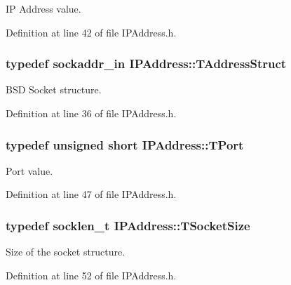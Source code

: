 I\-P Address value. 



Definition at line 42 of file I\-P\-Address.\-h.

\hypertarget{class_i_p_address_a45062a631f57459b18c10c1c8fe310bf}{
\subsubsection[{T\-Address\-Struct}]{\setlength{\rightskip}{0pt plus 5cm}typedef sockaddr\-\_\-in {\bf I\-P\-Address\-::\-T\-Address\-Struct}\hspace{0.3cm}{\ttfamily [private]}}}\label{class_i_p_address_a45062a631f57459b18c10c1c8fe310bf}


B\-S\-D Socket structure. 



Definition at line 36 of file I\-P\-Address.\-h.

\hypertarget{class_i_p_address_a51188195685c31d4258c0a078cc37154}{
\subsubsection[{T\-Port}]{\setlength{\rightskip}{0pt plus 5cm}typedef unsigned short {\bf I\-P\-Address\-::\-T\-Port}}}\label{class_i_p_address_a51188195685c31d4258c0a078cc37154}


Port value. 



Definition at line 47 of file I\-P\-Address.\-h.

\hypertarget{class_i_p_address_a28c76ca7e5d4aa86d2caf0b742a23cdb}{
\subsubsection[{T\-Socket\-Size}]{\setlength{\rightskip}{0pt plus 5cm}typedef socklen\-\_\-t {\bf I\-P\-Address\-::\-T\-Socket\-Size}}}\label{class_i_p_address_a28c76ca7e5d4aa86d2caf0b742a23cdb}


Size of the socket structure. 



Definition at line 52 of file I\-P\-Address.\-h.




